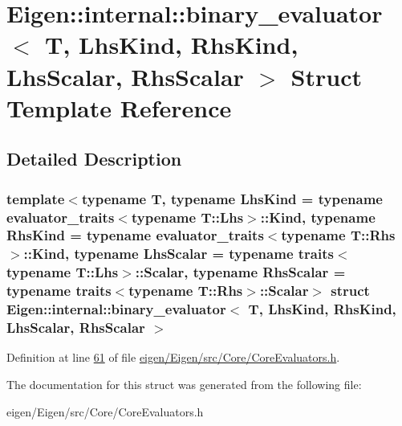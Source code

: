 \hypertarget{struct_eigen_1_1internal_1_1binary__evaluator}{}\section{Eigen\+:\+:internal\+:\+:binary\+\_\+evaluator$<$ T, Lhs\+Kind, Rhs\+Kind, Lhs\+Scalar, Rhs\+Scalar $>$ Struct Template Reference}
\label{struct_eigen_1_1internal_1_1binary__evaluator}


\subsection{Detailed Description}
\subsubsection*{template$<$typename T, typename Lhs\+Kind = typename evaluator\+\_\+traits$<$typename T\+::\+Lhs$>$\+::\+Kind, typename Rhs\+Kind = typename evaluator\+\_\+traits$<$typename T\+::\+Rhs$>$\+::\+Kind, typename Lhs\+Scalar = typename traits$<$typename T\+::\+Lhs$>$\+::\+Scalar, typename Rhs\+Scalar = typename traits$<$typename T\+::\+Rhs$>$\+::\+Scalar$>$\newline
struct Eigen\+::internal\+::binary\+\_\+evaluator$<$ T, Lhs\+Kind, Rhs\+Kind, Lhs\+Scalar, Rhs\+Scalar $>$}



Definition at line \hyperlink{eigen_2_eigen_2src_2_core_2_core_evaluators_8h_source_l00061}{61} of file \hyperlink{eigen_2_eigen_2src_2_core_2_core_evaluators_8h_source}{eigen/\+Eigen/src/\+Core/\+Core\+Evaluators.\+h}.



The documentation for this struct was generated from the following file\+:\begin{DoxyCompactItemize}
\item 
eigen/\+Eigen/src/\+Core/\+Core\+Evaluators.\+h\end{DoxyCompactItemize}
